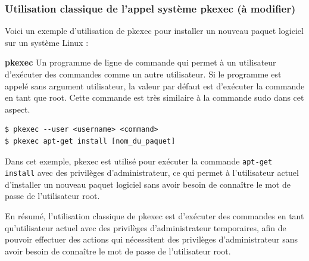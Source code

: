 \documentclass[12pt,a4paper]{article}
\newcommand{\code}[1]{\colorbox{light-gray}{\texttt{#1}}}
\begin{document}
\begin{flushleft}
\begin{flushleft}
                \subsubsection{Utilisation classique de l'appel système pkexec (à modifier)}
                \begin{flushleft}
                    \noindent Voici un exemple d'utilisation de pkexec pour installer un nouveau paquet logiciel sur un système Linux :
                    \item \textbf{pkexec} Un programme de ligne de commande qui permet à un utilisateur d’exécuter des commandes comme un autre utilisateur. Si le programme est appelé sans argument utilisateur, la valeur par défaut est d’exécuter la commande en tant que root. Cette commande est très similaire à la commande sudo dans cet aspect. \cite{CVE2021425:online}
                    \begin{lstlisting}
$ pkexec --user <username> <command>
$ pkexec apt-get install [nom_du_paquet]
                    \end{lstlisting}
                    \item Dans cet exemple, pkexec est utilisé pour exécuter la commande \code{apt-get install} avec des privilèges d'administrateur, ce qui permet à l'utilisateur actuel d'installer un nouveau paquet logiciel sans avoir besoin de connaître le mot de passe de l'utilisateur root.
                    \item En résumé, l'utilisation classique de pkexec est d'exécuter des commandes en tant qu'utilisateur actuel avec des privilèges d'administrateur temporaires, afin de pouvoir effectuer des actions qui nécessitent des privilèges d'administrateur sans avoir besoin de connaître le mot de passe de l'utilisateur root.
                \end{flushleft}

\end{flushleft}
\end{flushleft}
\end{document}

